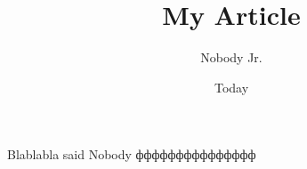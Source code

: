\documentclass[11pt]{article}
\begin{document}
\title{My Article}
\author{Nobody Jr.}
\date{Today}
\maketitle

Blablabla said Nobody 
ффффффффффффффф ~\cite{klitzing:qhe}



\end{document}

